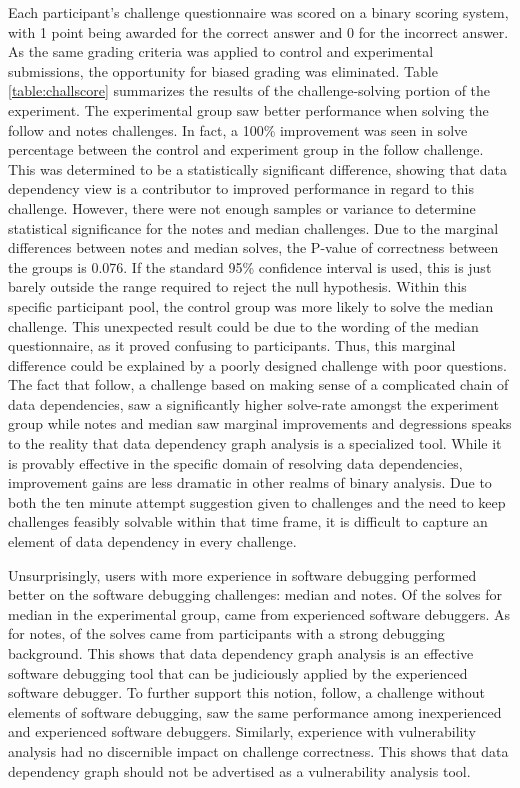 Each participant's challenge questionnaire was scored on a binary scoring system, with 1 point being awarded for the correct answer and 0 for the incorrect answer. As the same grading criteria was applied to control and experimental submissions, the opportunity for biased grading was eliminated. Table \ref{table:challscore} summarizes the results of the challenge-solving portion of the experiment. The experimental group saw better performance when solving the follow and notes challenges. In fact, a 100\% improvement was seen in solve percentage between the control and experiment group in the follow challenge. This was determined to be a statistically significant difference, showing that data dependency view is a contributor to improved performance in regard to this challenge. However, there were not enough samples or variance to determine statistical significance for the notes and median challenges. Due to the marginal differences between notes and median solves, the P-value of correctness between the groups is 0.076. If the standard 95\% confidence interval is used, this is just barely outside the range required to reject the null hypothesis. Within this specific participant pool, the control group was more likely to solve the median challenge. This unexpected result could be due to the wording of the median questionnaire, as it proved confusing to participants. Thus, this marginal difference could be explained by a poorly designed challenge with poor questions. The fact that follow, a challenge based on making sense of a complicated chain of data dependencies, saw a significantly higher solve-rate amongst the experiment group while notes and median saw marginal improvements and degressions speaks to the reality that data dependency graph analysis is a specialized tool. While it is provably effective in the specific domain of resolving data dependencies, improvement gains are less dramatic in other realms of binary analysis. Due to both the ten minute attempt suggestion given to challenges and the need to keep challenges feasibly solvable within that time frame, it is difficult to capture an element of data dependency in every challenge.

Unsurprisingly, users with more experience in software debugging performed better on the software debugging challenges: median and notes. Of the \expmediancorrect{} solves for median in the experimental group, \experiencedexpmediancorrect{} came from experienced software debuggers. As for notes, \experiencedexpnotescorrect{} of the \expnotescorrect{} solves came from participants with a strong debugging background. This shows that data dependency graph analysis is an effective software debugging tool that can be judiciously applied by the experienced software debugger. To further support this notion, follow, a challenge without elements of software debugging, saw the same performance among inexperienced and experienced software debuggers. Similarly, experience with vulnerability analysis had no discernible impact on challenge correctness. This shows that data dependency graph should not be advertised as a vulnerability analysis tool. 

